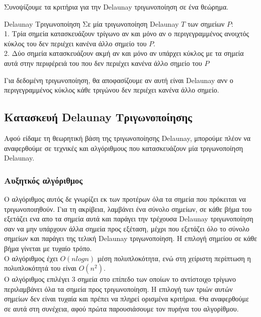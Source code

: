 \documentclass[oneside,12pt]{book}
\theoremstyle{definition}
\begin{document}
Συνοψίζουμε τα κριτήρια για την Delaunay τριγωνοποίηση σε ένα θεώρημα. \\

\begin{mytheorem}{Delaunay Τριγωνοποίηση}{}
	Σε μία τριγωνοποίηση Delaunay \(T\) των σημείων \(P\): \\
	1. Τρία σημεία κατασκευάζουν τρίγωνο αν και μόνο αν ο περιγεγραμμένος ανοιχτός κύκλος του δεν περιέχει κανένα άλλο σημείο του \(P\). \\
	2. Δύο σημεία κατασκευάζουν ακμή αν και μόνο αν υπάρχει κύκλος με τα σημεία αυτά στην περιφέρειά του που δεν περιέχει κανένα άλλο σημείο του \(P\) 	
\end{mytheorem}

Για δεδομένη τριγωνοποίηση, θα αποφασίζουμε αν αυτή είναι Delaunay ανν ο περιγεγραμμένος κύκλος κάθε τριγώνου δεν περιέχει κανένα άλλο σημείο. \\

\subsection{Κατασκευή Delaunay Τριγωνοποίησης}

Αφού είδαμε τη θεωρητική βάση της τριγωνοποίησης Delaunay, μπορούμε πλέον να αναφερθούμε σε τεχνικές και αλγόριθμους που κατασκευάζουν μία τριγωνοποίηση Delaunay. \\

\subsubsection{Αυξητκός αλγόριθμος}

Ο αλγόριθμος αυτός δε γνωρίζει εκ των προτέρων όλα τα σημεία που πρόκειται να τριγωνοποιηθούν. Για τη ακρίβεια, λαμβάνει ένα σύνολο σημείων, σε κάθε βήμα του εξετάζει ενα απο τα σημεία αυτά και παράγει την τρέχουσα Delaunay τριγωνοποίηση σαν να μην υπάρχουν άλλα σημεία προς εξέταση, μέχρι που εξετάζει όλο το σύνολο σημείων και παράγει της τελική Delaunay τριγωνοποίηση. Η επιλογή σημείου σε κάθε βήμα γίνεται με τυχαίο τρόπο. \\

Ο αλγόριθμος έχει \(Ο(n logn)\) μέση πολυπλοκότητα, ενώ στη χείριστη περίπτωση η πολυπλοκότητά του είναι \(O(n^2)\). \\

Ο αλγόριθμος επιλέγει 3 σημεία στο επίπεδο των οποίων το αντίστοιχο τρίγωνο περιλαμβάνει όλα τα σημεία προς τριγωνοποίηση. Η επιλογή των τριών αυτών σημείων δεν είναι τυχαία και πρέπει να πληρεί ορισμένα κριτήρια. Θα αναφερθούμε σε αυτά στη συνέχεια, αφού πρώτα παρουσιάσουμε τον πυρήνα του αλγορίθμου. \\
\end{document}
